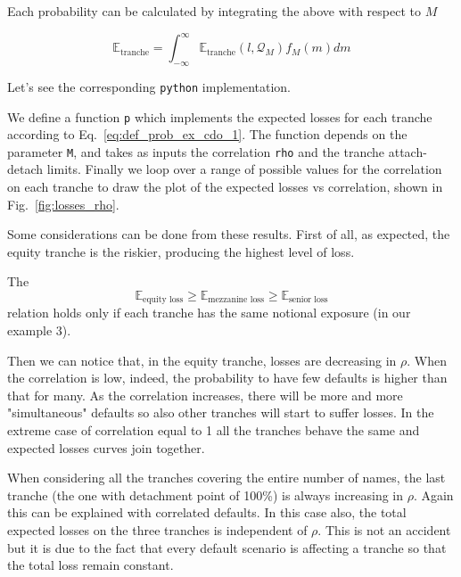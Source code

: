 Each probability can be calculated by integrating the above with respect to $M$
	
\begin{equation} 
\mathbb{E}_{\mathrm{tranche}} = \int_{-\infty}^{\infty}{\mathbb{E}_{\mathrm{tranche}}(l, \mathcal{Q}_M) f_M(m)dm}
\end{equation}

Let's see the corresponding \texttt{python} implementation.


We define a function \texttt{p} which implements the expected losses for each tranche according to Eq.~\ref{eq:def_prob_ex_cdo_1}.
The function depends on the parameter \texttt{M}, and takes as inputs the correlation \texttt{rho} and the tranche attach-detach limits.
Finally we loop over a range of possible values for the correlation on each tranche to draw the plot of the expected losses vs correlation, shown in Fig.~\ref{fig:losses_rho}.

Some considerations can be done from these results. First of all, as expected, the equity tranche is the riskier, producing the highest level of loss. 

The 
\begin{equation}
\mathbb{E}_{\textrm{equity loss}} \ge \mathbb{E}_{\textrm{mezzanine loss}} \ge \mathbb{E}_{\textrm{senior loss}}
\end{equation}
relation holds only if each tranche has the same notional exposure (in our example 3).

Then we can notice that, in the equity tranche, losses are decreasing in $\rho$. When the correlation is low, indeed, the probability to have few defaults is higher than that for many. As the correlation increases, there will be more and more "simultaneous" defaults so also other tranches will start to suffer losses. In the extreme case of correlation equal to 1 all the tranches behave the same and expected losses curves join together. 

When considering all the tranches covering the entire number of names, the last tranche (the one with detachment point of 100\%) is always increasing in $\rho$. Again this can be explained with correlated defaults. In this case also, the total expected losses on the three tranches is independent of $\rho$. This is not an accident but it is due to the fact that every default scenario is affecting a tranche so that the total loss remain constant.

